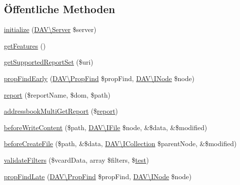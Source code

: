 \subsection*{Öffentliche Methoden}
\begin{DoxyCompactItemize}
\item 
\mbox{\hyperlink{class_sabre_1_1_card_d_a_v_1_1_plugin_aee4e0afab89d4398386a47fbb1625490}{initialize}} (\mbox{\hyperlink{class_sabre_1_1_d_a_v_1_1_server}{D\+A\+V\textbackslash{}\+Server}} \$server)
\item 
\mbox{\hyperlink{class_sabre_1_1_card_d_a_v_1_1_plugin_af27ac378dd0c8a6061c80a2f85f20849}{get\+Features}} ()
\item 
\mbox{\hyperlink{class_sabre_1_1_card_d_a_v_1_1_plugin_a0feb5a070f030e514ded0b06b2252a83}{get\+Supported\+Report\+Set}} (\$uri)
\item 
\mbox{\hyperlink{class_sabre_1_1_card_d_a_v_1_1_plugin_affbc0f165596dbf8cfdb8ce4f6da4905}{prop\+Find\+Early}} (\mbox{\hyperlink{class_sabre_1_1_d_a_v_1_1_prop_find}{D\+A\+V\textbackslash{}\+Prop\+Find}} \$prop\+Find, \mbox{\hyperlink{interface_sabre_1_1_d_a_v_1_1_i_node}{D\+A\+V\textbackslash{}\+I\+Node}} \$node)
\item 
\mbox{\hyperlink{class_sabre_1_1_card_d_a_v_1_1_plugin_a9f09093f18cfdf7f7d19d240f10f340e}{report}} (\$report\+Name, \$dom, \$path)
\item 
\mbox{\hyperlink{class_sabre_1_1_card_d_a_v_1_1_plugin_aeabe6cede7304e451c9d84c803ad0796}{addressbook\+Multi\+Get\+Report}} (\$\mbox{\hyperlink{class_sabre_1_1_card_d_a_v_1_1_plugin_a9f09093f18cfdf7f7d19d240f10f340e}{report}})
\item 
\mbox{\hyperlink{class_sabre_1_1_card_d_a_v_1_1_plugin_aea2ad427d67f6a4dcf83710550a57ea9}{before\+Write\+Content}} (\$path, \mbox{\hyperlink{interface_sabre_1_1_d_a_v_1_1_i_file}{D\+A\+V\textbackslash{}\+I\+File}} \$node, \&\$data, \&\$modified)
\item 
\mbox{\hyperlink{class_sabre_1_1_card_d_a_v_1_1_plugin_a97c2b4b09f5d14e1cd3b0228b99a1267}{before\+Create\+File}} (\$path, \&\$data, \mbox{\hyperlink{interface_sabre_1_1_d_a_v_1_1_i_collection}{D\+A\+V\textbackslash{}\+I\+Collection}} \$parent\+Node, \&\$modified)
\item 
\mbox{\hyperlink{class_sabre_1_1_card_d_a_v_1_1_plugin_a851161fc7bd719aa9ae8ee55fd25388e}{validate\+Filters}} (\$vcard\+Data, array \$filters, \$\mbox{\hyperlink{classtest}{test}})
\item 
\mbox{\hyperlink{class_sabre_1_1_card_d_a_v_1_1_plugin_a8bd2a8bc246af244dbf0aeb57675de61}{prop\+Find\+Late}} (\mbox{\hyperlink{class_sabre_1_1_d_a_v_1_1_prop_find}{D\+A\+V\textbackslash{}\+Prop\+Find}} \$prop\+Find, \mbox{\hyperlink{interface_sabre_1_1_d_a_v_1_1_i_node}{D\+A\+V\textbackslash{}\+I\+Node}} \$node)

\end{DoxyCompactItemize}
